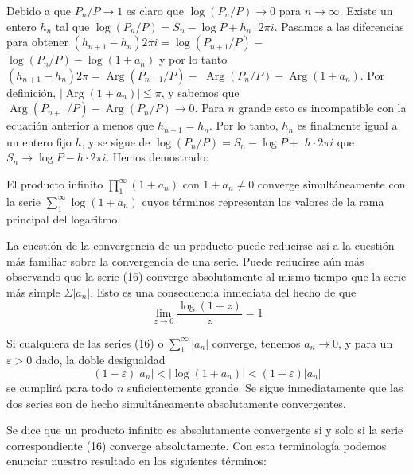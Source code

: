 \documentclass{article}
\theoremstyle{nonumberplain}
\begin{document}
Debido a que \( P_{n} / P \rightarrow 1 \) es claro que \( \log \left(P_{n} / P\right) \rightarrow 0 \) para \( n \rightarrow \infty \). Existe un entero \( h_{n} \) tal que \( \log \left(P_{n} / P\right)=S_{n}-\log P+h_{n} \cdot 2 \pi i \). Pasamos a las diferencias para obtener \( \left(h_{n+1}-h_{n}\right) 2 \pi i=\log \left(P_{n+1} / P\right)- \) \( \log \left(P_{n} / P\right)-\log \left(1+a_{n}\right) \) y por lo tanto \( \left(h_{n+1}-h_{n}\right) 2 \pi=\operatorname{Arg}\left(P_{n+1} / P\right)- \) \( \operatorname{Arg}\left(P_{n} / P\right)-\operatorname{Arg}\left(1+a_{n}\right) \). Por definición, \( \left|\operatorname{Arg}\left(1+a_{n}\right)\right| \leqq \pi \), y sabemos que \( \operatorname{Arg}\left(P_{n+1} / P\right)-\operatorname{Arg}\left(P_{n} / P\right) \rightarrow 0 \). Para \( n \) grande esto es incompatible con la ecuación anterior a menos que \( h_{n+1}=h_{n} \). Por lo tanto, \( h_{n} \) es finalmente igual a un entero fijo \( h \), y se sigue de \( \log \left(P_{n} / P\right)=S_{n}-\log P+ \) \( h \cdot 2 \pi i \) que \( S_{n} \rightarrow \log P-h \cdot 2 \pi i \). Hemos demostrado:

\begin{theorem}[5]
El producto infinito \( \prod_{1}^{\infty}\left(1+a_{n}\right) \) con \( 1+a_{n} \neq 0 \) converge simultáneamente con la serie \( \sum_{1}^{\infty} \log \left(1+a_{n}\right) \) cuyos términos representan los valores de la rama principal del logaritmo.
\end{theorem}

La cuestión de la convergencia de un producto puede reducirse así a la cuestión más familiar sobre la convergencia de una serie. Puede reducirse aún más observando que la serie (16) converge absolutamente al mismo tiempo que la serie más simple \( \Sigma\left|a_{n}\right| \). Esto es una consecuencia inmediata del hecho de que
\[
\lim _{z \rightarrow 0} \frac{\log (1+z)}{z}=1
\]

Si cualquiera de las series (16) o \( \sum_{1}^{\infty}\left|a_{n}\right| \) converge, tenemos \( a_{n} \rightarrow 0 \), y para un \( \varepsilon>0 \) dado, la doble desigualdad
\[
(1-\varepsilon)\left|a_{n}\right|<\left|\log \left(1+a_{n}\right)\right|<(1+\varepsilon)\left|a_{n}\right|
\]
se cumplirá para todo \( n \) suficientemente grande. Se sigue inmediatamente que las dos series son de hecho simultáneamente absolutamente convergentes.

Se dice que un producto infinito es absolutamente convergente si y solo si la serie correspondiente (16) converge absolutamente. Con esta terminología podemos enunciar nuestro resultado en los siguientes términos:
\end{document}
